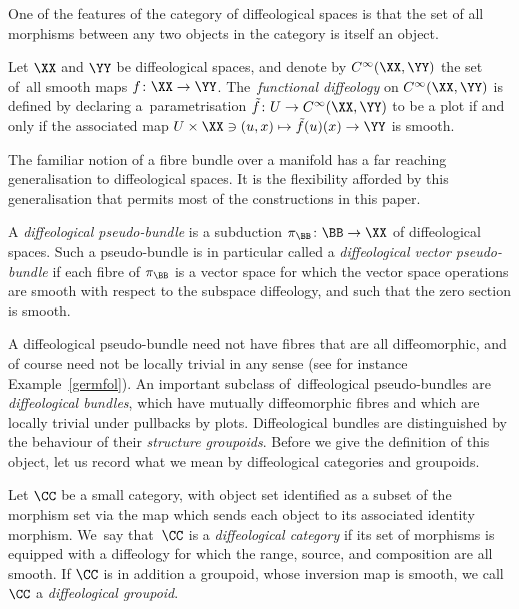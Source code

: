 One of the features of the category of diffeological spaces is that the set of all morphisms between any two objects in the category is itself an object.

\begin{Definition}
Let $\XX$ and $\YY$ be diffeological spaces, and denote by $C^{\infty}(\XX,\YY)$ the set of~all smooth maps $f\colon \XX\rightarrow \YY$. The~\textit{functional diffeology} on $C^{\infty}(\XX,\YY)$ is defined by declaring a~para\-metrisation $\tilde{f}\colon U\rightarrow C^{\infty}(\XX,\YY)$ to be a plot if and only if the associated map $U\times\XX\ni(u,x)\mapsto\tilde{f}(u)(x)\rightarrow\YY$ is smooth.
\end{Definition}

The familiar notion of a fibre bundle over a manifold has a far reaching generalisation to diffeological spaces. It is the flexibility afforded by this generalisation that permits most of the constructions in this paper.

\begin{Definition}%
A \textit{diffeological pseudo-bundle} is a subduction $\pi_{\BB}\colon \BB\rightarrow \XX$ of diffeological spaces. Such a pseudo-bundle is in particular called a \textit{diffeological vector pseudo-bundle} if each fibre of $\pi_{\BB}$ is a vector space for which the vector space operations are smooth with respect to the subspace diffeology, and such that the zero section is smooth.
\end{Definition}

A diffeological pseudo-bundle need not have fibres that are all diffeomorphic, and of course need not be locally trivial in any sense (see for instance Example~\ref{germfol}). An important subclass of~diffeological pseudo-bundles are \textit{diffeological bundles}, which have mutually diffeomorphic fibres and which are locally trivial under pullbacks by plots. Diffeological bundles are distinguished by the behaviour of their \textit{structure groupoids}. Before we give the definition of this object, let us record what we mean by diffeological categories and groupoids.

\begin{Definition}
Let $\CC$ be a small category, with object set identified as a subset of the morphism set via the map which sends each object to its associated identity morphism. We~say that~$\CC$ is a \textit{diffeological category} if its set of morphisms is equipped with a diffeology for which the range, source, and composition are all smooth. If $\CC$ is in addition a groupoid, whose inversion map is smooth, we call $\CC$ a \textit{diffeological groupoid}.
\end{Definition}

